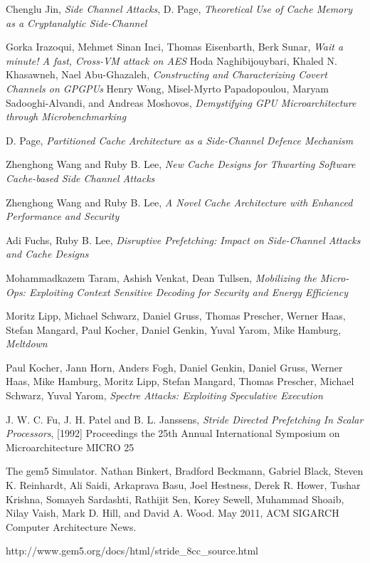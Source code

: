 \documentclass[twoside]{iitbreport}
\begin{document}
%
\begin{thebibliography}{99}
Chenglu Jin, {\it Side Channel Attacks},
D. Page, {\it Theoretical Use of Cache Memory as a Cryptanalytic Side-Channel}

Gorka Irazoqui, Mehmet Sinan Inci, Thomas Eisenbarth, Berk Sunar,  {\it Wait a minute! A fast, Cross-VM attack on AES}
Hoda Naghibijouybari,
Khaled N. Khasawneh,
Nael Abu-Ghazaleh,
{\it Constructing and Characterizing Covert Channels on GPGPUs}
Henry Wong, Misel-Myrto Papadopoulou, Maryam Sadooghi-Alvandi, and Andreas Moshovos, {\it Demystifying GPU Microarchitecture through Microbenchmarking}

D. Page, {\it Partitioned Cache Architecture as a Side-Channel Defence Mechanism}

Zhenghong Wang and Ruby B. Lee, {\it New Cache Designs for Thwarting Software Cache-based Side Channel Attacks}

Zhenghong Wang and Ruby B. Lee, {\it A Novel Cache Architecture with Enhanced Performance and Security}

Adi Fuchs, Ruby B. Lee, {\it Disruptive Prefetching: Impact on Side-Channel Attacks and Cache Designs}

Mohammadkazem Taram, Ashish Venkat, Dean Tullsen, {\it Mobilizing the Micro-Ops: Exploiting Context Sensitive Decoding for Security and Energy Efficiency}

Moritz Lipp, Michael Schwarz, Daniel Gruss, Thomas Prescher, Werner Haas,
Stefan Mangard, Paul Kocher, Daniel Genkin, Yuval Yarom, Mike Hamburg, {\it Meltdown}

Paul Kocher, Jann Horn, Anders Fogh, Daniel Genkin, Daniel Gruss, Werner Haas, Mike Hamburg, Moritz Lipp, Stefan Mangard, Thomas Prescher, Michael Schwarz, Yuval Yarom, {\it Spectre Attacks: Exploiting Speculative Execution}

J. W. C. Fu, J. H. Patel and B. L. Janssens, {\it Stride Directed Prefetching In Scalar Processors}, [1992] Proceedings the 25th Annual International Symposium on Microarchitecture MICRO 25

The gem5 Simulator. Nathan Binkert, Bradford Beckmann, Gabriel Black, Steven K. Reinhardt, Ali Saidi, Arkaprava Basu, Joel Hestness, Derek R. Hower, Tushar Krishna, Somayeh Sardashti, Rathijit Sen, Korey Sewell, Muhammad Shoaib, Nilay Vaish, Mark D. Hill, and David A. Wood. May 2011, ACM SIGARCH Computer Architecture News.

http://www.gem5.org/docs/html/stride_8cc_source.html
\end{thebibliography}
\end{document}
